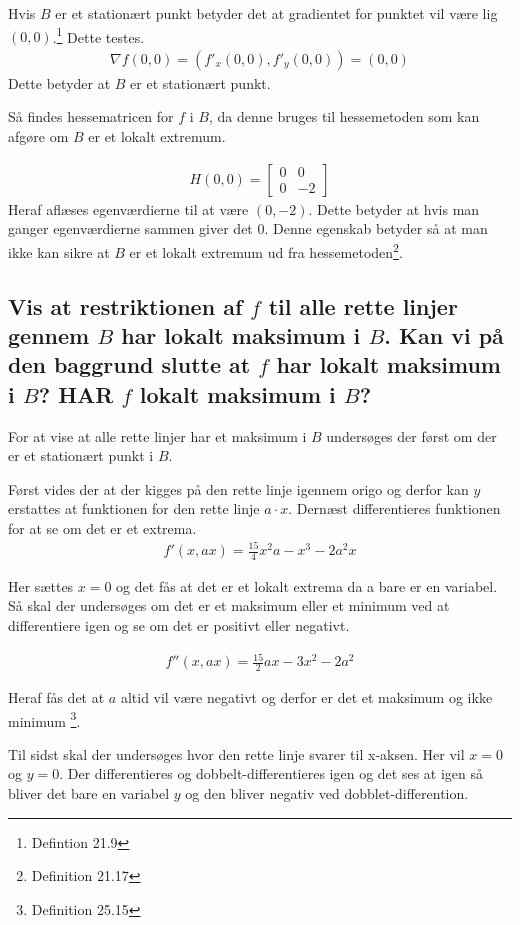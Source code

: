 Hvis $B$ er et stationært punkt betyder det at gradientet for punktet vil være lig $(0,0)$.\footnote{Defintion 21.9} Dette testes.
\begin{align}
    \nabla f(0,0) = \left(f'_x(0,0),f'_y(0,0)\right) = (0,0)
\end{align}
Dette betyder at $B$ er et stationært punkt.

Så findes hessematricen for $f$ i $B$, da denne bruges til hessemetoden som kan afgøre om $B$ er et lokalt extremum.

\begin{align}
    H(0,0) = 
    \left[
        \begin{array}{cc}
            0 & 0\\0 & -2
        \end{array}
    \right] 
\end{align}
Heraf aflæses egenværdierne til at være $(0,-2)$.
Dette betyder at hvis man ganger egenværdierne sammen giver det 0. Denne egenskab betyder så at man ikke kan sikre at $B$ er et lokalt extremum ud fra hessemetoden\footnote{Definition 21.17}.



\subsection{Vis at restriktionen af $f$ til alle rette linjer gennem $B$ har lokalt maksimum i $B$. Kan vi på den baggrund slutte at $f$ har lokalt maksimum i $B$? HAR $f$ lokalt maksimum i $B$?}

For at vise at alle rette linjer har et maksimum i $B$ undersøges der først om der er et stationært punkt i $B$.

Først vides der at der kigges på den rette linje igennem origo og derfor kan $y$ erstattes at funktionen for den rette linje $a\cdot x$. Dernæst differentieres funktionen for at se om det er et extrema.
\begin{align}
    f'(x,ax) = \frac{15}{4} x^{2} a -x^{3}-2 a^{2} x
\end{align}

Her sættes $x=0$ og det fås at det er et lokalt extrema da a bare er en variabel. Så skal der undersøges om det er et maksimum eller et minimum ved at differentiere igen og se om det er positivt eller negativt. 

\begin{align}
    f''(x,ax) = \frac{15}{2} a x -3 x^{2}-2 a^{2}
\end{align}

Heraf fås det at $a$ altid vil være negativt og derfor er det et maksimum og ikke minimum \footnote{Definition 25.15}. 

Til sidst skal der undersøges hvor den rette linje svarer til x-aksen. Her vil $x=0$ og $y=0$. Der differentieres og dobbelt-differentieres igen og det ses at igen så bliver det bare en variabel $y$ og den bliver negativ ved dobblet-differention. 
